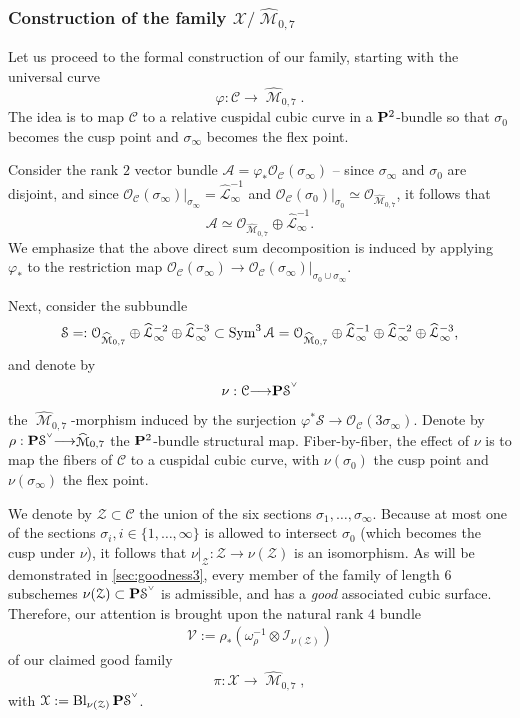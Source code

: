 \documentclass[12pt,reqno]{amsart}
\DeclareMathOperator{\Bl}{Bl}
\DeclareMathOperator{\M}{\mathcal{M}}
\renewcommand{\to}{{\longrightarrow}}
\numberwithin{equation}{section}
\renewcommand{\O}{\mathcal O}
\newcommand{\V}{\mathcal V}
\newcommand{\cC}{\mathcal{C}}
\newcommand{\cX}{\mathcal{X}}
\newcommand{\hL}{\widehat{\mathcal{L}}}
\newcommand{\smvee}{\raise0.5ex\hbox{$\scriptscriptstyle\vee$}}
\newcommand{\hM}{\widehat{\M}}
\begin{document}
\subsubsection{Construction of the family $\cX/\hM_{0,7}$}
\label{sec:constr-family-hM07}

Let us proceed to the formal construction of our family, starting with
the universal curve
$$\varphi: \cC \to \hM_{0,7}.$$
The idea is to map $\cC$ to a relative cuspidal cubic curve in a
$\P^{2}$-bundle so that $\sigma_{0}$ becomes the cusp point and
$\sigma_{\infty}$ becomes the flex point.


Consider the rank $2$
vector bundle $\mathcal{A} = \varphi_{*}\O_{\cC}(\sigma_{\infty})$ --
since $\sigma_{\infty}$ and $\sigma_{0}$ are disjoint, and since
$\O_{\cC}(\sigma_{\infty})|_{\sigma_{\infty}} = \hL_{\infty}^{-1}$ and
$\O_{\cC}(\sigma_{0})|_{\sigma_{0}} \simeq \O_{\hM_{0,7}}$, it follows
that
$$\mathcal{A} \simeq \O_{\hM_{0,7}} \oplus \hL_{\infty}^{-1}.$$
We emphasize that the above direct sum decomposition is induced by
applying $\varphi_{*}$ to the restriction map
$\O_{\cC}(\sigma_{\infty}) \to \O_{\cC}(\sigma_{\infty})|_{\sigma_{0}
  \cup \sigma_{\infty}}.$

  Next, consider the subbundle
  \begin{align}
    \label{eq:S}
    \mathcal{S} = :\O_{\hM_{0,7}} \oplus \hL_{\infty}^{-2} \oplus \hL_{\infty}^{-3} \subset \Sym^{3} \mathcal{A} = \O_{\hM_{0,7}} \oplus \hL_{\infty}^{-1} \oplus \hL_{\infty}^{-2} \oplus \hL_{\infty}^{-3},
  \end{align}
  and denote by
  \begin{align}
    \label{eq:nu}
    \nu: \cC \to \P \mathcal{S}^{\smvee}
  \end{align}
  the $\hM_{0,7}$-morphism induced by the surjection
  $\varphi^{*}\mathcal{S} \to \O_{\cC}(3\sigma_{\infty})$. Denote by
  $\rho: \P \mathcal{S}^{\smvee} \to \hM_{0,7}$ the $\P^{2}$-bundle
  structural map.  Fiber-by-fiber, the effect of $\nu$ is to map the
  fibers of $\cC$ to a cuspidal cubic curve, with $\nu(\sigma_{0})$
  the cusp point and $\nu(\sigma_{\infty})$ the flex point.

  We denote by $\mathcal{Z} \subset \cC$ the union of the six sections
  $\sigma_{1}, \dots, \sigma_{\infty}$.  Because at most one of the
  sections $\sigma_{i}, i \in \{1, \dots, \infty\}$ is allowed to
  intersect $\sigma_{0}$ (which becomes the cusp under $\nu$), it
  follows that $\nu|_{\mathcal{Z}}:\mathcal{Z} \to \nu(\mathcal{Z})$
  is an isomorphism. As will be demonstrated in
  \autoref{sec:goodness3}, every member of the family of length $6$
  subschemes $\nu(\mathcal{Z}) \subset \P \mathcal{S}^{\smvee}$ is
  admissible, and has a {\sl good} associated cubic surface.
  Therefore, our attention is brought upon the natural rank $4$ bundle
  \begin{align}
    \label{eq:V3}
    \V := \rho_{*}\left(\omega_{\rho}^{-1} \otimes \mathcal{I}_{\nu(\mathcal{Z})}\right)
  \end{align}
  of our claimed good family $$\pi: \cX \to \hM_{0,7},$$ with
  $\cX := \Bl_{\nu(\mathcal{Z})}\P \mathcal{S}^{\smvee}$.
\end{document}
